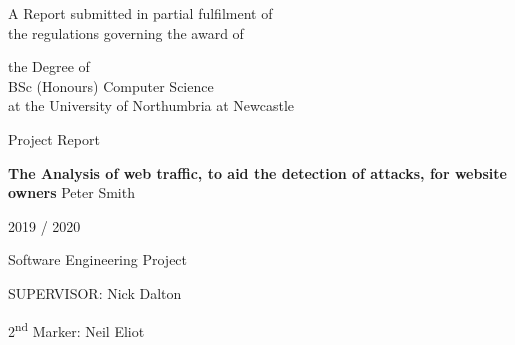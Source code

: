 
\begin{titlepage}
\Large
A Report submitted in partial fulfilment of\\
 the regulations governing the award of
\par
the Degree of\\[5mm]
{\huge	 BSc (Honours) Computer Science }\\[5mm]
at the University of Northumbria at Newcastle
\par
\vspace*{1in}
{\Large Project Report}
\par\vspace{1em}
{\Huge \bfseries The Analysis of web traffic, to aid the detection of attacks, for website owners}
\vfill
Peter Smith
\par\vspace{1em}
2019 / 2020
\par\vspace{1em}
Software Engineering Project
\par\vspace{1em}
SUPERVISOR: Nick Dalton
\par
2\textsuperscript{\small nd} Marker: Neil Eliot
\end{titlepage}
